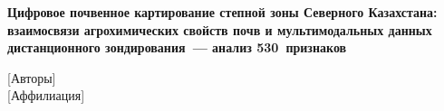 \documentclass[a4paper,11pt]{article}
\begin{document}
\begin{center}
{\LARGE\bfseries Цифровое почвенное картирование степной зоны Северного Казахстана: \\[4pt] взаимосвязи агрохимических свойств почв и мультимодальных данных дистанционного зондирования~--- анализ 530~признаков}

\vspace{1.5em}
{\large [Авторы]}\\[0.5em]
{\normalsize [Аффилиация]}
\vspace{2em}
\end{center}



\tableofcontents
\newpage








\newpage

\end{document}
